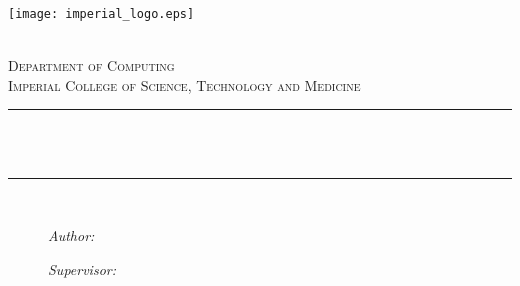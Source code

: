 \begin{title}

\newcommand{\HRule}{\rule{\linewidth}{0.5mm}} %


\texttt{[image: imperial\_logo.eps]}\\[0.5cm] 

\center %
 

\textsc{\LARGE \reporttype}\\[1.5cm] 
\textsc{\Large Department of Computing}\\[0.5cm] 
\textsc{\large Imperial College of Science, Technology and Medicine}\\[0.5cm] 


\HRule \\[0.4cm]
{ \huge \bfseries \reporttitle}\\ %
\HRule \\[1.5cm]
 

\begin{figure}[H]
	\begin{minipage}[t]{0.49 \linewidth}
		\large\emph{Author:}\\
		\reportauthor
	\end{minipage}
	\begin{minipage}[t]{0.49 \linewidth}
	\begin{flushright}
 		\large\emph{Supervisor:} \\
		\supervisor
	\end{flushright}
	\end{minipage}
\end{figure}
	

\end{title}
